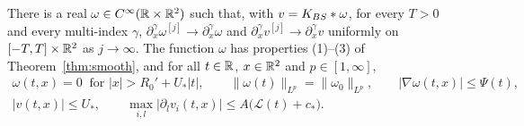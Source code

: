 \begin{proposition}
\label{prop:iter-limit}
There is a real $\omega\in C^\infty(\mathbb{R}\times\mathbb{R}^2)$ such that, with
$v=K_{BS}\ast\omega$, for every $T>0$ and every multi-index $\gamma$,
$\partial_x^\gamma\omega^{[j]}\to\partial_x^\gamma\omega$ and
$\partial_x^\gamma v^{[j]}\to\partial_x^\gamma v$ uniformly on $[-T,T]\times\mathbb{R}^2$
as $j\to\infty$. The function $\omega$ has properties \textup{(1)}--\textup{(3)}
of Theorem~\ref{thm:smooth}, and for all $t\in\mathbb{R}$, $x\in\mathbb{R}^2$ and
$p\in[1,\infty]$,
\begin{equation}
\label{eq:limit-bounds}
\begin{gathered}
\omega(t,x)=0\ \text{ for }|x|>R_0'+U_*|t|,\qquad
\|\omega(t)\|_{L^p}=\|\omega_0\|_{L^p},\qquad |\nabla\omega(t,x)|\le\Psi(t),\\
|v(t,x)|\le U_*,\qquad \max_{i,l}|\partial_lv_i(t,x)|\le A\big(\mathcal L(t)+c_*\big).
\end{gathered}
\end{equation}
\end{proposition}

